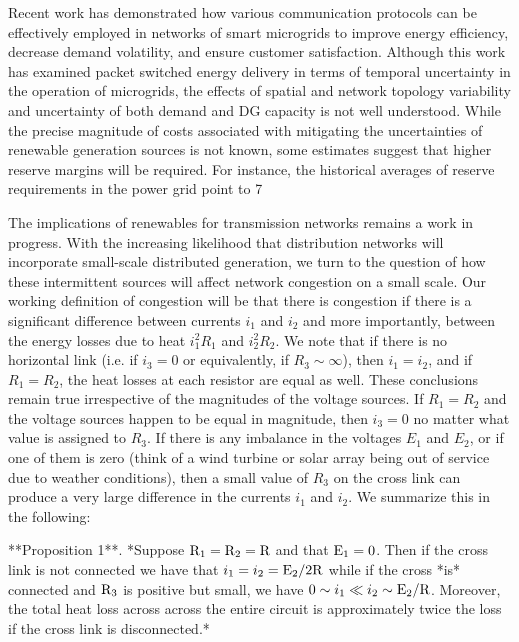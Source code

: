 Recent work has demonstrated how various communication protocols can be effectively employed in networks of smart microgrids to improve energy efficiency, decrease demand volatility, and ensure customer satisfaction. Although this work has examined packet switched energy delivery in terms of temporal uncertainty in the operation of microgrids, the effects of spatial and network topology variability and uncertainty of both demand and DG capacity is not well understood. While the precise magnitude of costs associated with mitigating the uncertainties of renewable generation sources is not known, some estimates suggest that higher reserve margins will be required. For instance, the historical averages of reserve requirements in the power grid point to 7%

The implications of renewables for transmission networks remains a work in progress. With the increasing likelihood that distribution networks will incorporate small-scale distributed generation, we turn to the question of how these intermittent sources will affect network congestion on a small scale. Our working definition of congestion will be that there is congestion if there is a significant difference between currents $i_1$ and $i_2$ and more importantly, between the energy losses due to heat $i_1^2R_1$ and $i_2^2R_2$. We note that if there is no horizontal link (i.e. if $i_3=0$ or equivalently, if $R_3\sim\infty$), then $i_1=i_2$, and if $R_1=R_2$, the heat losses at each resistor are equal as well. These conclusions remain true irrespective of the magnitudes of the voltage sources. If $R_1=R_2$ and the voltage sources happen to be equal in magnitude, then $i_3=0$ no matter what value is assigned to $R_3$. If there is any imbalance in the voltages $E_1$ and $E_2$, or if one of them is zero (think of a wind turbine or solar array being out of service due to weather conditions), then a small value of $R_3$ on the cross link can produce a very large difference in the currents $i_1$ and $i_2$. We summarize this in the following:

**Proposition 1**. *Suppose ${\text R_1}={\text R _2}={\text R}$ and that ${\text E_1}=0$. Then if the cross link is not connected we have that $i_1=i_2={\text E_2}/2{\text R}$ while if the cross *is* connected and ${\text R_3}$ is positive but small, we have $0\sim i_1\ll i_2\sim {\text E_2}/{\text R}$. Moreover, the total heat loss across across the entire circuit is approximately twice the loss if the cross link is disconnected.*

